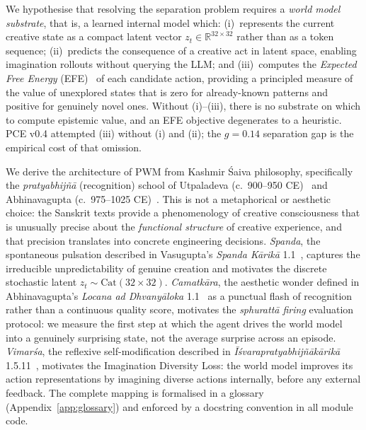\documentclass[journal,onecolumn,11pt]{IEEEtran}
\begin{document}
We hypothesise that resolving the separation problem requires a
\emph{world model substrate}, that is, a learned internal model which:
(i)~represents the current creative state as a compact latent vector
$z_t \in \mathbb{R}^{32 \times 32}$ rather than as a token sequence;
(ii)~predicts the consequence of a creative act in latent space, enabling
imagination rollouts without querying the LLM; and
(iii)~computes the \emph{Expected Free Energy} (EFE)~\cite{friston2017active}
of each candidate action, providing a principled measure of the value of
unexplored states that is zero for already-known patterns and positive for
genuinely novel ones.
Without (i)--(iii), there is no substrate on which to compute epistemic value,
and an EFE objective degenerates to a heuristic.
PCE v0.4 attempted (iii) without (i) and (ii); the $g{=}0.14$ separation gap
is the empirical cost of that omission.

We derive the architecture of PWM from Kashmir Śaiva philosophy, specifically
the \emph{pratyabhijñā} (recognition) school of
Utpaladeva (c.\ 900--950 CE)~\cite{utpaladeva1994isvara,torella1994isvara}
and Abhinavagupta (c.\ 975--1025 CE)~\cite{abhinavagupta2012tantraloka,abhinava1992locana}.
This is not a metaphorical or aesthetic choice: the Sanskrit texts provide a
phenomenology of creative consciousness that is unusually precise about the
\emph{functional structure} of creative experience, and that precision
translates into concrete engineering decisions.
\emph{Spanda}, the spontaneous pulsation described in Vasugupta's
\emph{Spanda Kārikā} 1.1~\cite{vasugupta1992spanda,dyczkowski1992spanda},
captures the irreducible unpredictability of genuine creation and motivates
the discrete stochastic latent $z_t \sim \text{Cat}(32{\times}32)$.
\emph{Camatkāra}, the aesthetic wonder defined in Abhinavagupta's
\emph{Locana ad Dhvanyāloka} 1.1~\cite{abhinava1992locana} as a punctual
flash of recognition rather than a continuous quality score, motivates the
\emph{sphurattā firing} evaluation protocol: we measure the first step at
which the agent drives the world model into a genuinely surprising state,
not the average surprise across an episode.
\emph{Vimarśa}, the reflexive self-modification described in
\emph{Īśvarapratyabhijñākārikā} 1.5.11~\cite{utpaladeva1994isvara,torella1994isvara},
motivates the Imagination Diversity Loss: the world model improves its
action representations by imagining diverse actions internally, before any
external feedback.
The complete mapping is formalised in a glossary
(Appendix~\ref{app:glossary}) and enforced by a docstring convention in all
module code.
\end{document}
